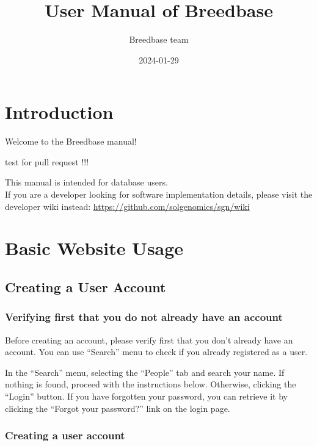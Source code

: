 \documentclass[
  12pt,
]{book}
\title{User Manual of Breedbase}
\author{Breedbase team}
\date{2024-01-29}
\begin{document}
\maketitle

{
\hypersetup{linkcolor=}
\setcounter{tocdepth}{2}
\tableofcontents
}
\hypertarget{introduction}{%
\chapter*{Introduction}\label{introduction}}


Welcome to the Breedbase manual!

test for pull request !!!

This manual is intended for database users.\\
If you are a developer looking for software implementation details, please visit the developer wiki instead: \url{https://github.com/solgenomics/sgn/wiki}

\hypertarget{basic-website-usage}{%
\chapter{Basic Website Usage}\label{basic-website-usage}}

\hypertarget{creating-a-user-account}{%
\section{Creating a User Account}\label{creating-a-user-account}}

\hypertarget{verifying-first-that-you-do-not-already-have-an-account}{%
\subsection{Verifying first that you do not already have an account}\label{verifying-first-that-you-do-not-already-have-an-account}}

Before creating an account, please verify first that you don't already have an account. You can use ``Search'' menu to check if you already registered as a user.

In the ``Search'' menu, selecting the ``People'' tab and search your name. If nothing is found, proceed with the instructions below. Otherwise, clicking the ``Login'' button. If you have forgotten your password, you can retrieve it by clicking the ``Forgot your password?'' link on the login page.

\hypertarget{creating-a-user-account-1}{%
\subsection{Creating a user account}\label{creating-a-user-account-1}}
\end{document}
